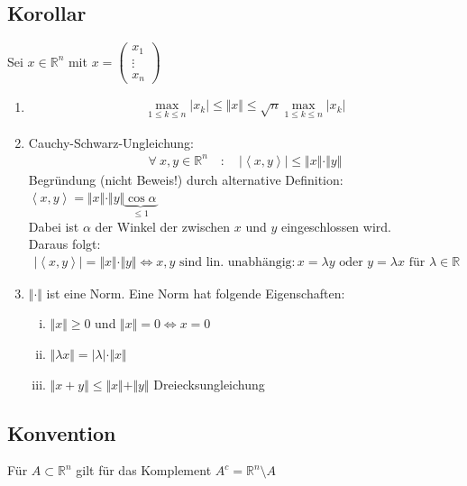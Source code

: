 \documentclass[11pt,a4paper]{book}
\newcommand {\R}	{\mathbb{R}}
\newcommand {\Rn}	{\mathbb{R}^n}
\newcommand{\1}    	{\mathbbm{1}}
\begin{document}
\subsection{Korollar}
Sei \(x \in \Rn\) mit \(x = \left(\begin{array}{c} x_1 \\ \vdots \\ x_n \end{array}\right)\)
\begin{enumerate}[1.~]
	\item \begin{align*}
		\max_{1 \leqslant k \leqslant n} \vert x_k \vert \leqslant \Vert x \Vert \leqslant \sqrt{n} \max_{1 \leqslant k \leqslant n} \vert x_k \vert
	\end{align*}
	\item Cauchy-Schwarz-Ungleichung:
	\begin{align*}
		\forall~ x,y \in \Rn \quad : \quad \vert \left< x,y \right> \vert \leqslant \Vert x \Vert \cdot \Vert y \Vert
	\end{align*}
	Begründung (nicht Beweis!) durch alternative Definition: \( \left< x,y \right> = \Vert x \Vert \cdot \Vert y \Vert \underbrace{\cos \alpha}_{\leqslant 1} \) \\
	Dabei ist \(\alpha\) der Winkel der zwischen \(x\) und \(y\) eingeschlossen wird. \\
	Daraus folgt:
	\begin{align*}
		\vert \left< x,y \right> \vert = \Vert x \Vert \cdot \Vert y \Vert
		\Leftrightarrow
		x,y \textrm{ sind lin. unabhängig} : x = \lambda y \textrm{ oder } y = \lambda x \textrm{ für } \lambda \in \R
	\end{align*}
	\item \(\Vert \cdot \Vert\) ist eine Norm. Eine Norm hat folgende Eigenschaften:
	\begin{enumerate}[(i)]
		\item \( \Vert x \Vert \geqslant 0 \) und \( \Vert x \Vert = 0 \Leftrightarrow x = 0 \)
		\item \( \Vert \lambda x \Vert = \vert \lambda \vert \cdot \Vert x \Vert  \)
		\item \( \Vert x + y \Vert \leqslant \Vert x \Vert  + \Vert y \Vert \) Dreiecksungleichung
	\end{enumerate}
\end{enumerate}

\subsection{Konvention}
Für \(A \subset \Rn\) gilt für das Komplement \(A^c = \Rn \setminus A\)
\end{document}
